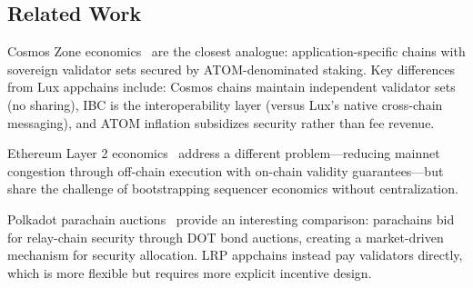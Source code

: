 \subsection{Related Work}

Cosmos Zone economics~\cite{kwon2016cosmos} are the closest analogue: application-specific
chains with sovereign validator sets secured by ATOM-denominated staking. Key differences
from Lux appchains include: Cosmos chains maintain independent validator sets (no sharing),
IBC is the interoperability layer (versus Lux's native cross-chain messaging), and ATOM
inflation subsidizes security rather than fee revenue.

Ethereum Layer 2 economics~\cite{konstantopoulos2021optimism} address a different
problem---reducing mainnet congestion through off-chain execution with on-chain validity
guarantees---but share the challenge of bootstrapping sequencer economics without
centralization.

Polkadot parachain auctions~\cite{wood2016polkadot} provide an interesting comparison:
parachains bid for relay-chain security through DOT bond auctions, creating a market-driven
mechanism for security allocation. LRP appchains instead pay validators directly, which is
more flexible but requires more explicit incentive design.

